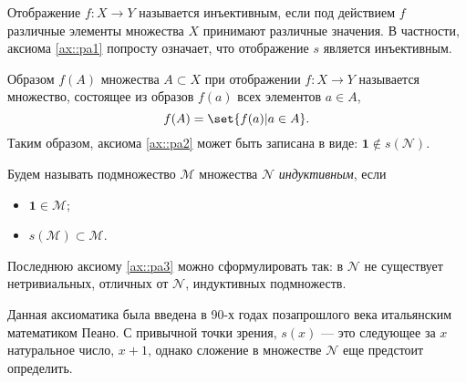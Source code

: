 \documentclass{article}
\begin{document}
\begin{remark}
    Отображение \(f \colon X \to Y\) называется инъективным, если под действием $f$ различные элементы множества $X$ принимают различные значения. В частности, аксиома \ref{ax::pa1} попросту означает, что отображение \(s\) является инъективным.
\end{remark}
\begin{remark}
    Образом \( f(A) \) множества \( A \subset X \) при отображении \(f \colon X \to Y \) называется множество, состоящее из образов \( f(a) \) всех элементов \( a \in A \),
    \[
        f(A) = \set{ f(a) |  a \in A }.
    \]
    Таким образом, аксиома \ref{ax::pa2} может быть записана в виде: \( \mathbf{1} \notin s(\mathcal{N}) \).
\end{remark}

\begin{definition}
    Будем называть подмножество \( \mathcal{M} \) множества \(\mathcal{N} \) \textit{индуктивным}, если
    \begin{itemize}[noitemsep, topsep=0pt,parsep=0pt]
        \item \( \mathbf{1} \in \mathcal{M} \);
        \item \( s(\mathcal{M}) \subset \mathcal{M} \).
    \end{itemize}
\end{definition}
\begin{remark}
    Последнюю аксиому \ref{ax::pa3} можно сформулировать так: в \( \mathcal{N} \) не существует нетривиальных, \ie отличных от \( \mathcal{N} \), индуктивных подмножеств.    
\end{remark}

Данная аксиоматика была введена в 90-х годах позапрошлого века итальянским математиком Пеано. С привычной точки зрения, \( s(x) \) --- это следующее за \( x \) натуральное число, \ie \( x + 1 \), однако сложение в множестве \( \mathcal{N} \) еще предстоит определить.
\end{document}
